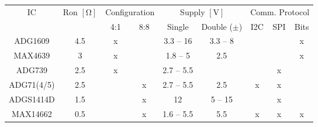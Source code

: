\begin{tabular}{ccccccccc}
\toprule
\multirow{2}{*}{IC} & \multirow{2}{*}{Ron $\mathrm{[\Omega]}$} & \multicolumn{2}{c}{Configuration} & \multicolumn{2}{c}{Supply $\mathrm{[V]}$} & \multicolumn{3}{c}{Comm. Protocol} \\
\cmidrule(r){3-4} \cmidrule(r){5-6} \cmidrule(r){7-9}
                    &                                 & 4:1             & 8:8             & Single        & Double ($\pm$)           & I2C       & SPI       & Bits       \\
\midrule
ADG1609             & 4.5                             & x               &                 & 3.3 -- 16      & 3.3 --  8    &           &           & x          \\
MAX4639             & 3                               & x               &                 & 1.8 -- 5       &  2.5        &           &           & x          \\
ADG739              & 2.5                             & x               &                 & 2.7 -- 5.5     &                  &           & x         &            \\
ADG71(4/5)          & 2.5                             &                 & x               & 2.7 -- 5.5     & 2.5        & x         & x         &            \\
ADGS1414D           & 1.5                             &                 & x               & 12             & 5 -- 15     &           & x         &            \\
MAX14662            & 0.5                            &                 & x               & 1.6 -- 5.5     & 5.5        & x         & x         & x          \\
\bottomrule 
\end{tabular}